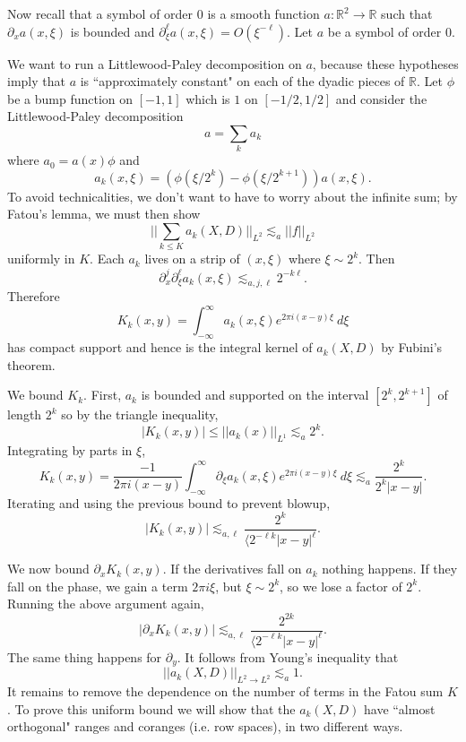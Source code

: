 \documentclass[12pt]{report}
\newcommand{\RR}{\mathbb{R}}
\theoremstyle{definition}
\begin{document}
Now recall that a symbol of order $0$ is a smooth function $a: \RR^2 \to \RR$ such that $\partial_xa(x,\xi)$ is bounded and $\partial_\xi^\ell a(x,\xi) = O(\xi^{-\ell})$.
Let $a$ be a symbol of order $0$.

We want to run a Littlewood-Paley decomposition on $a$, because these hypotheses imply that $a$ is ``approximately constant" on each of the dyadic pieces of $\RR$.
Let $\phi$ be a bump function on $[-1,1]$ which is $1$ on $[-1/2,1/2]$ and consider the Littlewood-Paley decomposition
$$a = \sum_k a_k$$
where $a_0 = a(x)\phi$ and
$$a_k(x, \xi) = (\phi(\xi/2^k) - \phi(\xi/2^{k+1}))a(x, \xi).$$
To avoid technicalities, we don't want to have to worry about the infinite sum; by Fatou's lemma, we must then show
$$||\sum_{k \leq K} a_k(X, D)||_{L^2} \lesssim_a ||f||_{L^2}$$
uniformly in $K$. Each $a_k$ lives on a strip of $(x, \xi)$ where $\xi \sim 2^k$. Then
$$\partial_x^j \partial_\xi^\ell a_k(x, \xi) \lesssim_{a,j,\ell} 2^{-k\ell}.$$
Therefore
$$K_k(x, y) = \int_{-\infty}^\infty a_k(x, \xi)e^{2\pi i(x-y)\xi}~d\xi$$
has compact support and hence is the integral kernel of $a_k(X, D)$ by Fubini's theorem.

We bound $K_k$. First, $a_k$ is bounded and supported on the interval $[2^k, 2^{k+1}]$ of length $2^k$ so by the triangle inequality,
$$|K_k(x, y)| \leq ||a_k(x)||_{L^1} \lesssim_a 2^k.$$
Integrating by parts in $\xi$,
$$K_k(x, y) = \frac{-1}{2\pi i(x-y)} \int_{-\infty}^\infty \partial_\xi a_k(x,\xi)e^{2\pi i(x-y)\xi}~d\xi \lesssim_a \frac{2^k}{2^k|x-y|}.$$
Iterating and using the previous bound to prevent blowup,
$$|K_k(x, y)| \lesssim_{a,\ell} \frac{2^k}{\langle 2^{-\ell k}|x-y|^\ell}.$$

We now bound $\partial_x K_k(x,y)$. If the derivatives fall on $a_k$ nothing happens. If they fall on the phase, we gain a term $2\pi i\xi$, but $\xi \sim 2^k$, so we lose a factor of $2^k$. Running the above argument again,
$$|\partial_x K_k(x, y)| \lesssim_{a,\ell} \frac{2^{2k}}{\langle 2^{-\ell k}|x-y|^\ell}.$$
The same thing happens for $\partial_y$.
It follows from Young's inequality that
$$||a_k(X, D)||_{L^2 \to L^2} \lesssim_a 1.$$
It remains to remove the dependence on the number of terms in the Fatou sum $K$.
To prove this uniform bound we will show that the $a_k(X, D)$ have ``almost orthogonal" ranges and coranges (i.e. row spaces), in two different ways.
\end{document}
